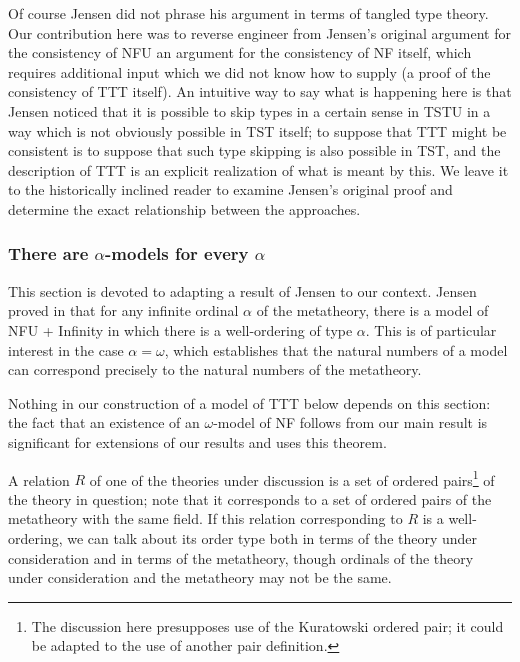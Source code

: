 \documentclass{article}
\theoremstyle{definition}
\theoremstyle{remark}
\begin{document}
Of course Jensen did not phrase his argument in terms of tangled type theory.  Our contribution here was to reverse engineer from Jensen's original argument for the consistency of NFU an argument for the consistency of NF itself, which requires additional input which we did not know how to supply (a proof of the consistency of TTT itself).  An intuitive way to say what is happening here is that Jensen noticed that it is possible to skip types in a certain sense in TSTU in a way which is not obviously possible in TST itself;  to suppose that TTT might be consistent is to suppose that such type skipping is also possible in TST, and the description of TTT is an explicit realization of what is meant by this.  We leave it to the historically inclined reader to examine Jensen's original proof and determine the exact relationship between the approaches.

\newpage

\subsubsection{There are $\alpha$-models for every $\alpha$}\label{subsection:alpha_models}

This section is devoted to adapting a result of Jensen to our context.  Jensen proved in \cite{nfu} that for any infinite ordinal $\alpha$ of the metatheory, there is a model of NFU + Infinity in which there is a well-ordering of type $\alpha$.  This is of particular interest in the case $\alpha=\omega$, which establishes that the natural numbers of a model can correspond precisely to the natural numbers of the metatheory.

Nothing in our construction of a model of TTT below depends on this section:  the fact that an existence of an $\omega$-model of NF follows from our main result is significant for extensions of our results and uses this theorem.

A relation $R$ of one of the theories under discussion is a set of ordered pairs\footnote{The discussion here presupposes use of the Kuratowski ordered pair;  it could be adapted to the use of another pair definition.}  of the theory in question;  note that it corresponds to a set of ordered pairs of the metatheory with the same field.  If this relation corresponding to  $R$ is a well-ordering, we can talk about its order type both in terms of the theory under consideration and in terms of the metatheory, though ordinals of the theory under consideration and the metatheory may not be the same.
\end{document}
